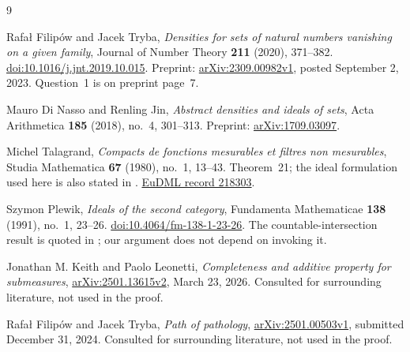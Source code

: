 \documentclass[11pt,a4paper]{article}
\theoremstyle{definition}
\theoremstyle{remark}
\begin{document}
\begin{thebibliography}{9}

Rafa\l{} Filip\'ow and Jacek Tryba,
\emph{Densities for sets of natural numbers vanishing on a given family},
Journal of Number Theory \textbf{211} (2020), 371--382.
\href{https://doi.org/10.1016/j.jnt.2019.10.015}{doi:10.1016/j.jnt.2019.10.015}.
Preprint: \href{https://arxiv.org/abs/2309.00982}{arXiv:2309.00982v1},
posted September 2, 2023. Question~1 is on preprint page~7.

Mauro Di Nasso and Renling Jin,
\emph{Abstract densities and ideals of sets},
Acta Arithmetica \textbf{185} (2018), no.~4, 301--313.
Preprint: \href{https://arxiv.org/abs/1709.03097}{arXiv:1709.03097}.

Michel Talagrand,
\emph{Compacts de fonctions mesurables et filtres non mesurables},
Studia Mathematica \textbf{67} (1980), no.~1, 13--43.
Theorem~21; the ideal formulation used here is also stated in
\cite[Theorem~1.7]{FT}.
\href{https://eudml.org/doc/218303}{EuDML record 218303}.

Szymon Plewik,
\emph{Ideals of the second category},
Fundamenta Mathematicae \textbf{138} (1991), no.~1, 23--26.
\href{https://doi.org/10.4064/fm-138-1-23-26}{doi:10.4064/fm-138-1-23-26}.
The countable-intersection result is quoted in
\cite[Theorem~1.9]{FT}; our argument does not depend on invoking it.

Jonathan M. Keith and Paolo Leonetti,
\emph{Completeness and additive property for submeasures},
\href{https://arxiv.org/abs/2501.13615}{arXiv:2501.13615v2},
March 23, 2026. Consulted for surrounding literature, not used in the
proof.

Rafa\l{} Filip\'ow and Jacek Tryba,
\emph{Path of pathology},
\href{https://arxiv.org/abs/2501.00503}{arXiv:2501.00503v1},
submitted December 31, 2024. Consulted for surrounding literature, not
used in the proof.

\end{thebibliography}
\end{document}

